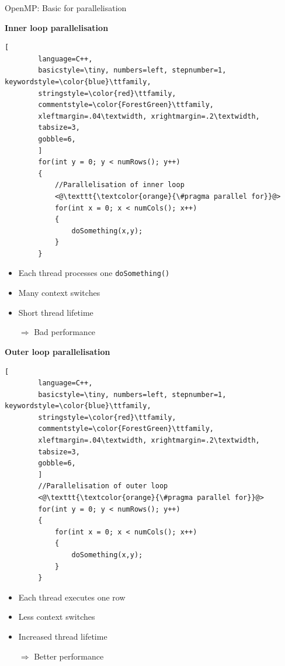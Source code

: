 \documentclass[shortpres,usenames,dvipsnames]{beamer}
\begin{document}
\begin{frame}[containsverbatim]{OpenMP: Basic for parallelisation}
	\begin{multicols}{2}
		\textbf{Inner loop parallelisation}
		\begin{lstlisting}[
		language=C++,
		basicstyle=\tiny, numbers=left, stepnumber=1, keywordstyle=\color{blue}\ttfamily,
		stringstyle=\color{red}\ttfamily,
		commentstyle=\color{ForestGreen}\ttfamily,
		xleftmargin=.04\textwidth, xrightmargin=.2\textwidth,
		tabsize=3,
		gobble=6,
		]
		for(int y = 0; y < numRows(); y++)
		{
			//Parallelisation of inner loop
			<@\texttt{\textcolor{orange}{\#pragma parallel for}}@>
			for(int x = 0; x < numCols(); x++)
			{
				doSomething(x,y);
			}
		}
		\end{lstlisting}
		
		\begin{itemize}
			\item Each thread processes one \verb|doSomething()|
			\item Many context switches
			\item Short thread lifetime
			\item[$\Rightarrow$] Bad performance 
		\end{itemize}
		
		\columnbreak
		
		\textbf{Outer loop parallelisation}
		\begin{lstlisting}[
		language=C++,
		basicstyle=\tiny, numbers=left, stepnumber=1, keywordstyle=\color{blue}\ttfamily,
		stringstyle=\color{red}\ttfamily,
		commentstyle=\color{ForestGreen}\ttfamily,
		xleftmargin=.04\textwidth, xrightmargin=.2\textwidth,
		tabsize=3,
		gobble=6,
		]
		//Parallelisation of outer loop
		<@\texttt{\textcolor{orange}{\#pragma parallel for}}@>
		for(int y = 0; y < numRows(); y++)
		{
			for(int x = 0; x < numCols(); x++)
			{
				doSomething(x,y);
			}
		}
		\end{lstlisting}
		
		\begin{itemize}
			\item Each thread executes one row
			\item Less context switches
			\item Increased thread lifetime
			\item[$\Rightarrow$] Better performance
		\end{itemize}
	\end{multicols}
\end{frame}
\end{document}

